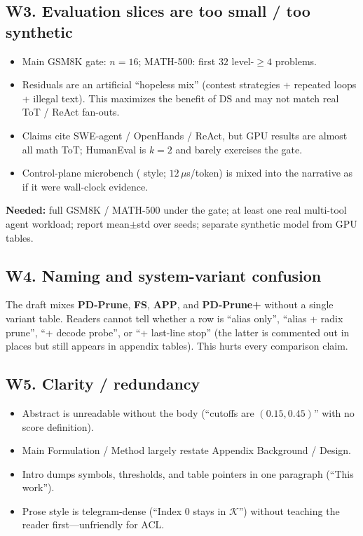 \documentclass[11pt]{article}
\newcommand{\sys}{\textsf{PD-Prune}\xspace}
\newcommand{\plus}{\textsf{PD-Prune+}}
\newcommand{\Keep}{\mathcal{K}}
\begin{document}
\subsection{W3. Evaluation slices are too small / too synthetic}
\begin{itemize}
  \item Main GSM8K gate: $n{=}16$; MATH-500: first $32$ level-$\ge 4$ problems.
  \item Residuals are an artificial ``hopeless mix'' (contest strategies +
        repeated loops + illegal text). This maximizes the benefit of
        $\mathrm{DS}$ and may not match real ToT / ReAct fan-outs.
  \item Claims cite SWE-agent / OpenHands / ReAct, but GPU results are almost
        all math ToT; HumanEval is $k{=}2$ and barely exercises the gate.
  \item Control-plane microbench ( style; $12\,\mu$s/token) is
        mixed into the narrative as if it were wall-clock evidence.
\end{itemize}
\textbf{Needed:} full GSM8K / MATH-500 under the gate; at least one real
multi-tool agent workload; report mean$\pm$std over seeds; separate synthetic
model from GPU tables.

\subsection{W4. Naming and system-variant confusion}
The draft mixes \textbf{\sys}, \textbf{FS}, \textbf{\textsf{APP}}, and
\textbf{\plus} without a single variant table. Readers cannot tell whether a
row is ``alias only'', ``alias + radix prune'', ``+ decode probe'', or
``+ last-line stop'' (the latter is commented out in places but still appears
in appendix tables). This hurts every comparison claim.

\subsection{W5. Clarity / redundancy}
\begin{itemize}
  \item Abstract is unreadable without the body (``cutoffs are $(0.15,0.45)$''
        with no score definition).
  \item Main Formulation / Method largely restate Appendix Background / Design.
  \item Intro dumps symbols, thresholds, and table pointers in one paragraph
        (``This work'').
  \item Prose style is telegram-dense (``Index $0$ stays in $\Keep$'') without
        teaching the reader first---unfriendly for ACL.
\end{itemize}
\end{document}
